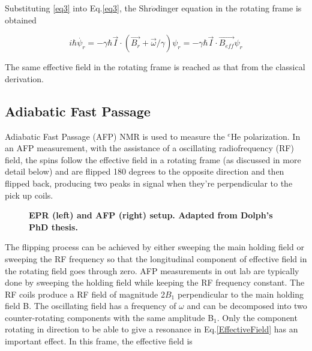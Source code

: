 Substituting \ref{eq3} into Eq.\ref{eq3}, the Shr$\ddot{o}$dinger equation in the rotating frame is obtained

\begin{equation}
i\hbar \dot{\psi_{r}}=-\gamma \hbar \vec{I}\cdot(\vec{B_{r}} + \vec{\omega}/\gamma)\psi_{r}=-\gamma \hbar \vec{I}\cdot\vec{B_{eff}}\psi_{r}
\end{equation}

The same effective field in the rotating frame is reached as that from the classical derivation.

\subsection{Adiabatic Fast Passage}

Adiabatic Fast Passage (AFP) NMR is used to measure the $^{e}$He polarization. In an AFP measurement, with the assistance of a oscillating radiofrequency (RF) field, the spins follow the effective field in a rotating frame (as discussed in more detail below) and are flipped 180 degrees to the opposite direction and then flipped back, producing two peaks in signal when they're perpendicular to the pick up coils.

\begin{figure}[H]
	\centering
	\caption{{\bf EPR (left) and AFP (right) setup. Adapted from Dolph's PhD thesis.}}
	\label{AFPandEPRsetup}
\end{figure}

The flipping process can be achieved by either sweeping the main holding field or sweeping the RF frequency so that the longitudinal component of effective field in the rotating field goes through zero. AFP measurements in out lab are typically done by sweeping the holding field while keeping the RF frequency constant. The RF coils produce a RF field of magnitude 2$B_{1}$ perpendicular to the main holding field B. The oscillating field has a frequency of $\omega$ and can be decomposed into two counter-rotating components with the same amplitude B$_{1}$. Only the component rotating in direction to be able to give a resonance in Eq.\ref{EffectiveField} has an important effect. In this frame, the effective field is

